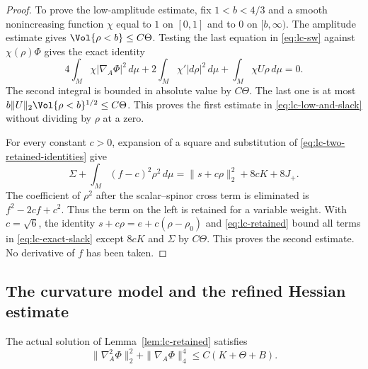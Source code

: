 \begin{proof}
To prove the low-amplitude estimate, fix $1<b<4/3$ and a smooth
nonincreasing function $\chi$ equal to $1$ on $[0,1]$ and to $0$
on $[b,\infty)$.  The amplitude estimate gives
$\Vol\{\rho<b\}\le C\Theta$.  Testing the last equation in
\eqref{eq:lc-sw} against $\chi(\rho)\Phi$ gives the exact identity
\begin{equation}\label{eq:lc-local-spinor-test}
 4\int_M\chi|\nabla_A\Phi|^2\,d\mu
 +2\int_M\chi'|d\rho|^2\,d\mu
 +\int_M\chi U\rho\,d\mu=0.
\end{equation}
The second integral is bounded in absolute value by $C\Theta$.
The last one is at most
$b\|U\|_2\Vol\{\rho<b\}^{1/2}\le C\Theta$.  This proves the
first estimate in \eqref{eq:lc-low-and-slack} without dividing by
$\rho$ at a zero.

For every constant $c>0$, expansion of a square and substitution of
\eqref{eq:lc-two-retained-identities} give
\begin{equation}\label{eq:lc-exact-slack}
 \Sigma+\int_M(f-c)^2\rho^2\,d\mu
 =\|s+c\rho\|_2^2+8cK+8J_+.
\end{equation}
The coefficient of $\rho^2$ after the scalar--spinor cross term is
eliminated is $f^2-2cf+c^2$.  Thus the term on the left is retained
for a variable weight.  With $c=\sqrt6$, the identity
$s+c\rho=e+c(\rho-\rho_0)$ and \eqref{eq:lc-retained} bound all
terms in \eqref{eq:lc-exact-slack} except $8cK$ and $\Sigma$ by
$C\Theta$.  This proves the second estimate.  No derivative of $f$
has been taken.
\end{proof}

\subsection{The curvature model and the refined Hessian estimate}

\begin{lemma}\label{lem:lc-hessian}
The actual solution of Lemma~\ref{lem:lc-retained} satisfies
\begin{equation}\label{eq:lc-refined-hessian}
 \|\nabla_A^2\Phi\|_2^2+\|\nabla_A\Phi\|_4^4
 \le C(K+\Theta+B).
\end{equation}
\end{lemma}


